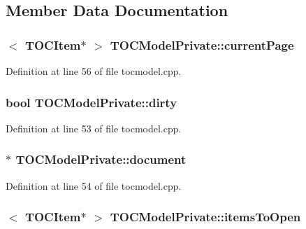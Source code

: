 \subsection{Member Data Documentation}
\hypertarget{classTOCModelPrivate_a12dee282cbd3e4aa96818a2aa27b714b}{
\subsubsection[{current\+Page}]{$<$ {\bf T\+O\+C\+Item}$\ast$ $>$ T\+O\+C\+Model\+Private\+::current\+Page}}\label{classTOCModelPrivate_a12dee282cbd3e4aa96818a2aa27b714b}


Definition at line 56 of file tocmodel.\+cpp.

\hypertarget{classTOCModelPrivate_ac5bc2d2648bec47d5ce8fe03c41484c6}{
\subsubsection[{dirty}]{\setlength{\rightskip}{0pt plus 5cm}bool T\+O\+C\+Model\+Private\+::dirty}}\label{classTOCModelPrivate_ac5bc2d2648bec47d5ce8fe03c41484c6}


Definition at line 53 of file tocmodel.\+cpp.

\hypertarget{classTOCModelPrivate_a7b98f39ef3b966a9a6a56f6ed6852183}{
\subsubsection[{document}]{$\ast$ T\+O\+C\+Model\+Private\+::document}}\label{classTOCModelPrivate_a7b98f39ef3b966a9a6a56f6ed6852183}


Definition at line 54 of file tocmodel.\+cpp.

\hypertarget{classTOCModelPrivate_a7b72023d2b92b6761a60dd2cd17d0930}{
\subsubsection[{items\+To\+Open}]{$<$ {\bf T\+O\+C\+Item}$\ast$ $>$ T\+O\+C\+Model\+Private\+::items\+To\+Open}}\label{classTOCModelPrivate_a7b72023d2b92b6761a60dd2cd17d0930}


